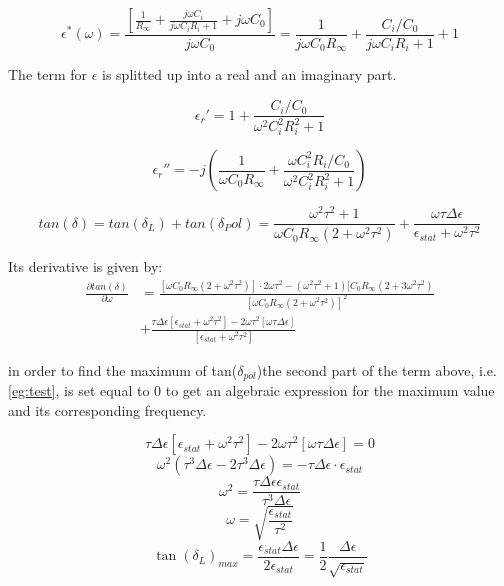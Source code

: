\begin{equation}
\epsilon^*(\omega)= \frac{[\frac{1}{R_\infty}+\frac{j \omega C_i}{j\omega C_i R_i  +1}+j \omega C_0]}{j \omega C_0} = \frac{1}{j \omega C_0 R_\infty}+ \frac{C_i/C_0}{j\omega C_i R_i  +1}+1
\end{equation}

The term for $\epsilon$ is splitted up into a real and an imaginary part. 

\begin{equation}
\epsilon_r' = 1+ \frac{C_i/C_0}{\omega^2 C_i^2 R_i^2 +1}
\end{equation}

\begin{equation}
\epsilon_r'' = -j \left(\frac{1}{\omega C_0 R_\infty}+\frac{\omega C_i^2 R_i / C_0}{\omega^2 C_i^2 R_i^2 +1} \right)
\end{equation}

\begin{equation}
tan(\delta) = tan(\delta_L) + tan( \delta_Pol) = \frac{\omega^2 \tau^2+1}{\omega C_0 R_\infty (2+ \omega^2 \tau^2)}+\frac{\omega \tau \Delta \epsilon}{\epsilon_{stat} + \omega^2 \tau^2}
\end{equation}

Its derivative is given by: 
\begin{align}
\frac{\partial tan(\delta)}{ \partial \omega} & = \frac{[\omega C_0 R_\infty (2+\omega^2 \tau^2)]\cdot 2 \omega \tau^2 - (\omega^2 \tau^2 +1) [C_0 R_\infty (2+3 \omega^2 \tau^2)  }{[\omega C_0 R_\infty (2+\omega^2 \tau^2)]^2}\\
					      & + \frac{\tau \Delta \epsilon [\epsilon_{stat} + \omega^2 \tau^2] - 2 \omega \tau^2 [\omega \tau \Delta \epsilon]}{[\epsilon_{stat} +\omega^2 \tau^2]}
\label{eg:test}
					      \end{align}

in order to find the maximum of tan($\delta_{pol}$)the second part of the term above, i.e. \eqref{eg:test}, is set equal to 0 to get an algebraic expression
for the maximum value and its corresponding frequency.

\begin{equation}
\tau \Delta \epsilon [\epsilon_{stat} + \omega^2 \tau^2] -2\omega \tau^2 [\omega \tau \Delta \epsilon] = 0
\end{equation}
\begin{equation}
\omega^2 (\tau^3 \Delta \epsilon -2 \tau^3 \Delta \epsilon) = - \tau \Delta \epsilon \cdot \epsilon_{stat}
\end{equation}
\begin{equation}
\omega^2 = \frac{\tau \Delta \epsilon \epsilon_{stat}}{\tau^3 \Delta \epsilon}
\end{equation}
\begin{equation}
\omega = \sqrt{\frac{\epsilon_{stat}}{\tau^2}}
\end{equation}
\begin{equation}
\tan(\delta_L)_{max} = \frac{\epsilon_{stat} \Delta\epsilon}{2\epsilon_{stat}} = \frac{1}{2} \frac{\Delta \epsilon}{\sqrt{\epsilon_{stat}}}
\end{equation}


